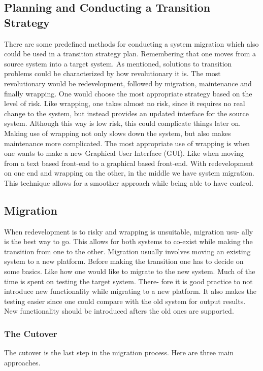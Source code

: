 \subsection{Planning and Conducting a Transition Strategy}
There are some predefined methods for conducting a system migration which
also could be used in a transition strategy plan. Remembering that one
moves from a source system into a target system. As mentioned, solutions to
transition problems could be characterized by how revolutionary it is. The
most revolutionary would be redevelopment, followed by migration, maintenance and finally wrapping. One would choose the most appropriate strategy based on the level of risk. 
Like wrapping, one takes almost no risk, since it requires no real change to the system, but instead provides an updated interface for the source system. Although this way is low risk, this could complicate things later on. Making use of wrapping not only slows down the system,
but also makes maintenance more complicated. The most appropriate use of
wrapping is when one wants to make a new Graphical User Interface (GUI).
Like when moving from a text based front-end to a graphical based front-end.
With redevelopment on one end and wrapping on the other, in the middle we
have system migration. This technique allows for a smoother approach while
being able to have control.

\subsection{Migration}
When redevelopment is to risky and wrapping is unsuitable, migration usu-
ally is the best way to go. This allows for both systems to co-exist while
making the transition from one to the other. Migration usually involves
moving an existing system to a new platform. Before making the transition
one has to decide on some basics. Like how one would like to migrate to the
new system. Much of the time is spent on testing the target system. There-
fore it is good practice to not introduce new functionality while migrating to
a new platform. It also makes the testing easier since one could compare with
the old system for output results. New functionality should be introduced
afters the old ones are supported.

\subsubsection{The Cutover}
The cutover is the last step in the migration process. 
Here are three main approaches.

